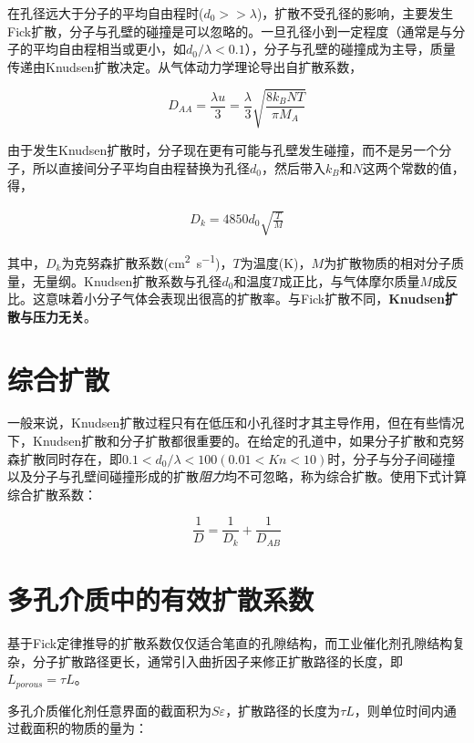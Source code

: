 在孔径远大于分子的平均自由程时($ d_0>>\lambda $)，扩散不受孔径的影响，主要发生Fick扩散，分子与孔壁的碰撞是可以忽略的。一旦孔径小到一定程度（通常是与分子的平均自由程相当或更小，如$ d_0/\lambda<0.1 $），分子与孔壁的碰撞成为主导，质量传递由Knudsen扩散决定。从气体动力学理论导出自扩散系数，

\begin{equation}
D_{AA} = \frac{\lambda u}{3} = \frac{\lambda}{3} \sqrt{\frac{8k_B NT}{\pi M_A}}
\end{equation}

由于发生Knudsen扩散时，分子现在更有可能与孔壁发生碰撞，而不是另一个分子，所以直接间分子平均自由程替换为孔径$ d_0 $，然后带入$ k_B $和$ N $这两个常数的值，得，

\begin{gather}
D_k = 4850d_0\sqrt{\frac{T}{M}}
\end{gather}

其中，$ D_k $为克努森扩散系数(\si{cm\squared\per\second})，$ T $为温度(\si{\kelvin})，$ M $为扩散物质的相对分子质量，无量纲。Knudsen扩散系数与孔径$ d_0 $和温度$ T $成正比，与气体摩尔质量$ M $成反比。这意味着小分子气体会表现出很高的扩散率。与Fick扩散不同，\textbf{Knudsen扩散与压力无关}。

\section{综合扩散}

一般来说，Knudsen扩散过程只有在低压和小孔径时才其主导作用，但在有些情况下，Knudsen扩散和分子扩散都很重要的。在给定的孔道中，如果分子扩散和克努森扩散同时存在，即$ 0.1<d_0/\lambda<100(0.01<Kn<10) $时，分子与分子间碰撞以及分子与孔壁间碰撞形成的扩散\textit{阻力}均不可忽略，称为综合扩散。使用下式计算综合扩散系数：

\begin{equation}
\frac{1}{D} = \frac{1}{D_k} + \frac{1}{D_{AB}}
\end{equation}

\section{多孔介质中的有效扩散系数}

基于Fick定律推导的扩散系数仅仅适合笔直的孔隙结构，而工业催化剂孔隙结构复杂，分子扩散路径更长，通常引入曲折因子来修正扩散路径的长度，即$ L_{porous}=\tau L $。

多孔介质催化剂任意界面的截面积为$ S\varepsilon $，扩散路径的长度为$ \tau L $，则单位时间内通过截面积的物质的量为：

